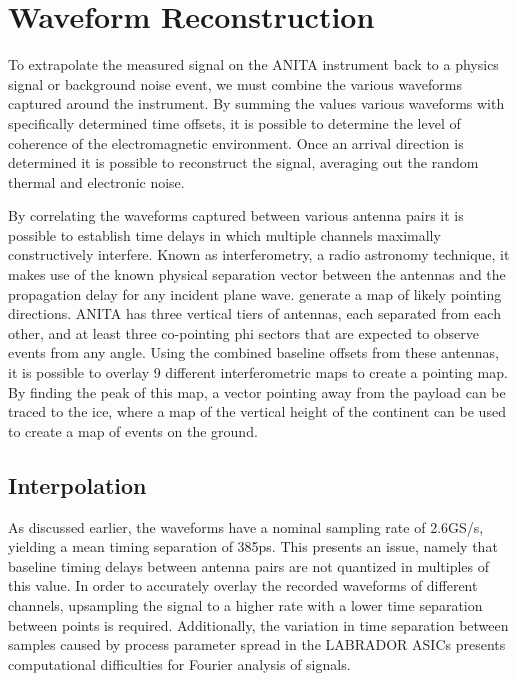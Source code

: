 \section{Waveform Reconstruction}
	To extrapolate the measured signal on the ANITA instrument back to a physics signal or background noise event, we must combine the various waveforms captured around the instrument.  By summing the values various waveforms with specifically determined time offsets, it is possible to determine the level of coherence of the electromagnetic environment.  Once an arrival direction is determined it is possible to reconstruct the signal, averaging out the random thermal and electronic noise.
	
	By correlating the waveforms captured between various antenna pairs it is possible to establish time delays in which multiple channels maximally constructively interfere.  Known as interferometry, a radio astronomy technique, it makes use of the known physical separation vector between the antennas and the propagation delay for any incident plane wave.  generate a map of likely pointing directions.  ANITA has three vertical tiers of antennas, each separated from each other, and at least three co-pointing phi sectors that are expected to observe events from any angle.  Using the combined baseline offsets from these antennas, it is possible to overlay 9 different interferometric maps to create a pointing map.  By finding the peak of this map, a vector pointing away from the payload can be traced to the ice, where a map of the vertical height of the continent can be used to create a map of events on the ground.
	
	\subsection{Interpolation}
		As discussed earlier, the waveforms have a nominal sampling rate of 2.6GS/s, yielding a mean timing separation of 385ps.  This presents an issue, namely that baseline timing delays between antenna pairs are not quantized in multiples of this value.  In order to accurately overlay the recorded waveforms of different channels, upsampling the signal to a higher rate with a lower time separation between points is required.  Additionally, the variation in time separation between samples caused by process parameter spread in the LABRADOR ASICs presents computational difficulties for Fourier analysis of signals.
		
